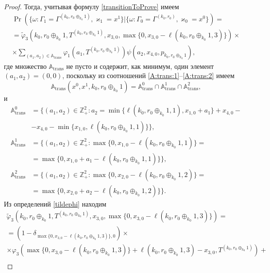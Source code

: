 \documentclass{report}
\begin{document}
\begin{proof}
Тогда, учитывая формулу \eqref{transitionToProve} имеем
\begin{multline*}
\Pr (\{\omega\colon \Gamma_{1}=\Gamma^{(k_0,r_0\oplus_{k_0}1)},\varkappa_{1}=x^1 \}|\{\omega\colon  \Gamma_{0}=\Gamma^{(k_0,r_0)},\varkappa_0=x^0\})=\\
=\widetilde{\varphi}_3(k_0,r_0\oplus_{k_0}1,T^{(k_0,r_0\oplus_{k_0}1)},x_{3,0},\max{\{0,x_{3,0} - \ell(k_0,r_0\oplus_{k_0}1,3)\}})\times \\
\times
\sum_{(a_1,a_2)\in {\mathbb A}_{\mathrm{trans}}}\varphi_1(a_1,T^{(k_0,r_0\oplus_{k_0}1)})  \psi(a_2,x_{4,0}, p_{k_0,r_0\oplus_{k_0}1}),
\end{multline*}
где множество ${\mathbb A}_{\mathrm{trans}}$ не пусто и содержит, как минимум, один элемент $(a_1,a_2)=(0,0)$, поскольку из соотношений \eqref{A:trans:1}--\eqref{A:trans:2} имеем
\begin{equation*}
{\mathbb A}_{\mathrm{trans}}(x^0,x^1,k_0,r_0\oplus_{k_0}1) = {\mathbb A}_{\mathrm{trans}}^0 \cap {\mathbb A}_{\mathrm{trans}}^1\cap {\mathbb A}_{\mathrm{trans}}^2,
\end{equation*}
и
\begin{align*}
{\mathbb A}_{\mathrm{trans}}^0 &= \{(a_1,a_2) \in \mathbb{Z}_+^2 \colon a_2 = \min{\{\ell(k_0,r_0\oplus_{k_0}1,1), x_{1,0}+a_1}\} +x_{4,0}- \\ 
&-x_{4,0} - \min{\{x_{1,0}, \ell(k_0,r_0\oplus_{k_0}1,1)\}}\},\\
{\mathbb A}_{\mathrm{trans}}^1 &= \{(a_1,a_2) \in \mathbb{Z}_+^2 \colon \max{\{0,x_{1,0} - \ell(k_0,r_0\oplus_{k_0}1,1)\}}=\\
&=\max{\{0,x_{1,0}+a_1-\ell(k_0,r_0\oplus_{k_0}1,1)\}}\},\\
 {\mathbb A}_{\mathrm{trans}}^2 &= \{(a_1,a_2) \in \mathbb{Z}_+^2 \colon  \max{\{0,x_{2,0} - \ell(k_0,r_0\oplus_{k_0}1,2)\}}=\\
 &=\max{\{0,x_{2,0}+a_2-\ell(k_0,r_0\oplus_{k_0}1,2)\}}\}.
\end{align*}
Из определений \eqref{tildephi} находим
\begin{multline*}
\widetilde{\varphi}_3(k_0,r_0\oplus_{k_0}1,T^{(k_0,r_0\oplus_{k_0}1)},x_{3,0},\max{\{0,x_{3,0} - \ell(k_0,r_0\oplus_{k_0}1,3)\}})= \\=(1-\delta_{\max{\{0,x_{3,0} - \ell(k_0,r_0\oplus_{k_0}1,3)\}},0}) \times \\\times\varphi_3(\max{\{0,x_{3,0} - \ell(k_0,r_0\oplus_{k_0}1,3)\}} + \ell (k_0,r_0\oplus_{k_0}1,3) - x_{3,0},T^{(k_0,r_0\oplus_{k_0}1)} ) +\\

\end{multline*}
\end{proof}
\end{document}

